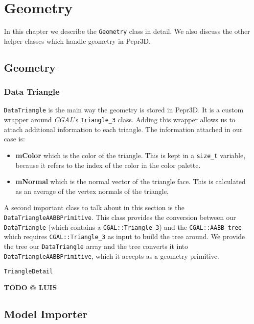 \chapter{Geometry}

In this chapter we describe the \texttt{Geometry} class in detail. We also discuss the other helper classes which handle geometry in Pepr3D.

\label{chap:geom}

\section{Geometry}

\subsection{Data Triangle}

\texttt{DataTriangle} is the main way the geometry is stored in Pepr3D. It is a custom wrapper around \textit{CGAL}'s \texttt{Triangle\_3} class. Adding this wrapper allows us to attach additional information to each triangle. The information attached in our case is:

\begin{itemize}
\item \textbf{mColor} which is the color of the triangle. This is kept in a \texttt{size\_t} variable, because it refers to the index of the color in the color palette.

\item \textbf{mNormal} which is the normal vector of the triangle face. This is calculated as an average of the vertex normals of the triangle.

\end{itemize}

A second important class to talk about in this section is the \texttt{Data\-Triangle\-AABB\-Primitive}. This class provides the conversion between our \texttt{Data\-Triangle} (which contains a \texttt{CGAL::Triangle\_3}) and the \texttt{CGAL::AABB\_tree} which requires \texttt{CGAL::Triangle\_3} as input to build the tree around. We provide the tree our \texttt{Data\-Triangle} array and the tree converts it into \texttt{Data\-Triangle\-AABB\-Primitive}, which it accepts as a geometry primitive.

\texttt{TriangleDetail}

\textbf{TODO @ LUIS}

\section{Model Importer}

